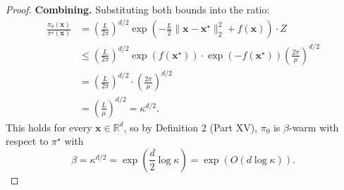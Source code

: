 \documentclass[12pt]{article}
\begin{document}
\begin{proof}
\textbf{Combining.} Substituting both bounds into the ratio:
\begin{align*}
\frac{\pi_0(\mathbf{x})}{\pi^\star(\mathbf{x})}
&= \left(\frac{L}{2\pi}\right)^{d/2} \exp\!\left(-\frac{L}{2}\|\mathbf{x} - \mathbf{x}^\star\|_2^2 + f(\mathbf{x})\right) \cdot Z \\
&\leq \left(\frac{L}{2\pi}\right)^{d/2} \exp(f(\mathbf{x}^\star)) \cdot \exp(-f(\mathbf{x}^\star))\left(\frac{2\pi}{\mu}\right)^{d/2} \\
&= \left(\frac{L}{2\pi}\right)^{d/2} \cdot \left(\frac{2\pi}{\mu}\right)^{d/2} \\
&= \left(\frac{L}{\mu}\right)^{d/2} = \kappa^{d/2}.
\end{align*}
This holds for every $\mathbf{x} \in \mathbb{R}^d$, so by Definition 2 (Part XV), $\pi_0$ is $\beta$-warm with respect to $\pi^\star$ with
\[
\beta = \kappa^{d/2} = \exp\!\left(\frac{d}{2}\log\kappa\right) = \exp(O(d\log\kappa)).
\]
\end{proof}
\end{document}
